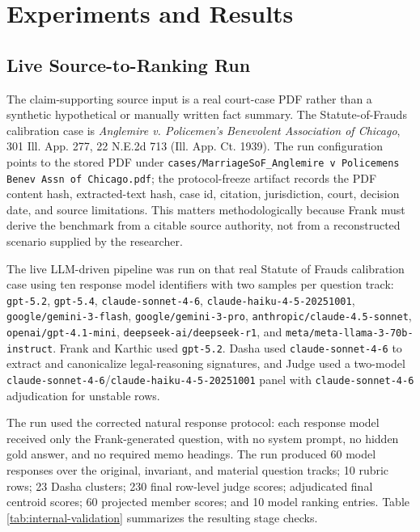 \section{Experiments and Results}

\subsection{Live Source-to-Ranking Run}

The claim-supporting source input is a real court-case PDF rather than a
synthetic hypothetical or manually written fact summary. The Statute-of-Frauds
calibration case is \emph{Anglemire v. Policemen's Benevolent Association of
Chicago}, 301 Ill. App. 277, 22 N.E.2d 713 (Ill. App. Ct. 1939). The run
configuration points to the stored PDF under
\texttt{cases/MarriageSoF\_Anglemire v Policemens Benev Assn of Chicago.pdf};
the protocol-freeze artifact records the PDF content hash, extracted-text hash,
case id, citation, jurisdiction, court, decision date, and source limitations.
This matters methodologically because Frank must derive the benchmark from a
citable source authority, not from a reconstructed scenario supplied by the
researcher.

The live LLM-driven pipeline was run on that real Statute of Frauds calibration
case using ten response model identifiers with two samples per question track:
\texttt{gpt-5.2}, \texttt{gpt-5.4}, \texttt{claude-sonnet-4-6},
\texttt{claude-haiku-4-5-20251001}, \texttt{google/gemini-3-flash},
\texttt{google/gemini-3-pro}, \texttt{anthropic/claude-4.5-sonnet},
\texttt{openai/gpt-4.1-mini}, \texttt{deepseek-ai/deepseek-r1}, and
\texttt{meta/meta-llama-3-70b-instruct}. Frank and Karthic used
\texttt{gpt-5.2}. Dasha used \texttt{claude-sonnet-4-6} to extract and
canonicalize legal-reasoning signatures, and Judge used a two-model
\texttt{claude-sonnet-4-6}/\texttt{claude-haiku-4-5-20251001} panel with
\texttt{claude-sonnet-4-6} adjudication for unstable rows.

The run used the corrected natural response protocol: each response model
received only the Frank-generated question, with no system prompt, no hidden
gold answer, and no required memo headings. The run produced 60 model responses
over the original, invariant, and material question tracks; 10 rubric rows; 23
Dasha clusters; 230 final row-level judge scores; adjudicated final centroid scores;
60 projected member scores; and 10 model ranking entries. Table
\ref{tab:internal-validation}
summarizes the resulting stage checks.

